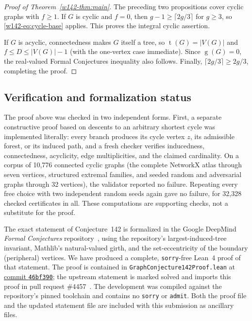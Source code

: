 \documentclass[11pt]{article}
\numberwithin{equation}{section}
\theoremstyle{remark}
\newcommand{\tr}{\operatorname{t}}
\newcommand{\gr}{\operatorname{g}}
\begin{document}
\begin{proof}[Proof of Theorem~\ref{w142-thm:main}]
The preceding two propositions cover cyclic graphs with $f\ge1$.  If $G$ is
cyclic and $f=0$, then $g-1\ge\lceil2g/3\rceil$ for $g\ge3$, so
\eqref{w142-eq:cycle-base} applies.  This proves the integral cyclic assertion.

If $G$ is acyclic, connectedness makes $G$ itself a tree, so
$\tr(G)=|V(G)|$ and $f\le D\le |V(G)|-1$ (with the one-vertex case
immediate).  Since $\gr(G)=0$, the real-valued Formal Conjectures inequality
also follows.  Finally,
$\lceil2g/3\rceil\ge2g/3$, completing the proof.
\end{proof}

\subsection{Verification and formalization status}\label{w142-sec:verification}

The proof above was checked in two independent forms.  First, a separate
constructive proof based on descents to an arbitrary shortest cycle was
implemented literally: every branch produces its cycle vertex $z$, its
admissible forest, or its induced path, and a fresh checker verifies
inducedness, connectedness, acyclicity, edge multiplicities, and the claimed
cardinality.  On a corpus of 10,776 connected cyclic graphs (the complete
NetworkX atlas through seven vertices, structured extremal families, and
seeded random and adversarial graphs through 32 vertices), the validator
reported no failure.  Repeating every free choice with two independent
random seeds again gave no failure, for 32,328 checked certificates in all.
These computations are supporting checks, not a substitute for the proof.

The exact statement of Conjecture~142 is formalized in the Google DeepMind
\emph{Formal Conjectures} repository~\cite{FC,FC142}, using the repository's
largest-induced-tree invariant, Mathlib's natural-valued girth, and the
set-eccentricity of the boundary (peripheral) vertices.  We have produced a
complete, \texttt{sorry}-free Lean~4 proof of that statement.  The proof is
contained in \texttt{GraphConjecture142Proof.lean} at
\href{https://github.com/AlperTheKing/formal-conjectures/commit/46bf39015f5c3c3ba3bfcf9f752b4b1e49b584ac}{commit \texttt{46bf390}}; the upstream statement is
marked solved and imports this proof in pull request \#4457~\cite{FC4457}.
The development was compiled against the repository's pinned toolchain and
contains no \texttt{sorry} or \texttt{admit}.  Both the proof file and the
updated statement file are included with this submission as ancillary files.
\end{document}
